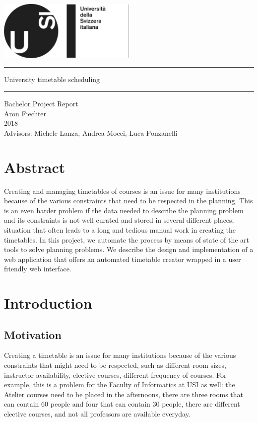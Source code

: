 \documentclass[12pt, a4paper, english]{report}
\begin{document}
\begin{titlepage}
\begin{center}
~\\[2cm]
\includegraphics[width=0.5\textwidth]{logo}\\[3.5cm]
\hrule height 1pt
\vspace{5mm}
{\Huge University timetable scheduling}
\vspace{3mm}
\hrule height 1pt
\vspace{1cm}
{\Large Bachelor Project Report}\\[3mm]
{\Large Aron Fiechter}\\[3mm]
{\Large 2018}\\[3.5cm]
{\large Advisors: Michele Lanza, Andrea Mocci, Luca Ponzanelli}
\end{center}
\end{titlepage}

\tableofcontents
\newpage

\chapter*{Abstract}
Creating and managing timetables of courses is an issue for many institutions because of the various constraints that need to be respected in the planning.
This is an even harder problem if the data needed to describe the planning problem and its constraints is not well curated and stored in several different places, situation that often leads to a long and tedious manual work in creating the timetables.
In this project, we automate the process by means of state of the art tools to solve planning problems.
We describe the design and implementation of a web application that offers an automated timetable creator wrapped in a user friendly web interface.

\newpage
\chapter{Introduction}
\section{Motivation}
Creating a timetable is an issue for many institutions because of the various constraints that might need to be respected, such as different room sizes, instructor availability, elective courses, different frequency of courses.
For example, this is a problem for the Faculty of Informatics at USI as well: the Atelier courses need to be placed in the afternoons, there are three rooms that can contain 60 people and four that can contain 30 people, there are different elective courses, and not all professors are available everyday.
\end{document}
